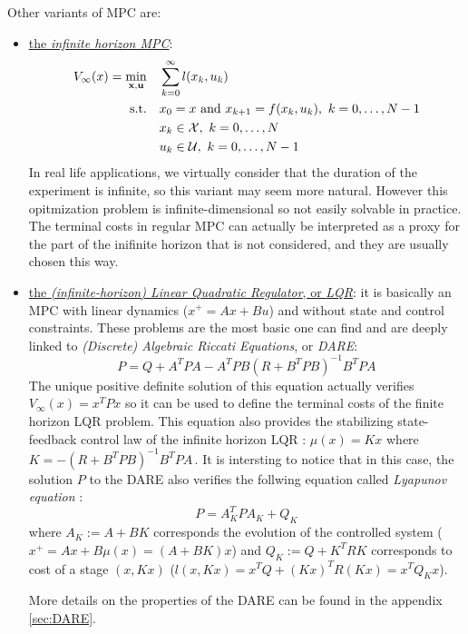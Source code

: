 \documentclass[12pt]{article}
\begin{document}
\vspace{12pt}

Other variants of MPC are:
\begin{itemize}[label=\textbullet]
	\item \underline{the \textit{infinite horizon MPC}}: 
	\begin{align*}
		V_\infty(x)=\underset{\mathbf{x},\mathbf{u}}{\min} &\quad \sum_{k=0}^{\infty}l(x_k,u_k)\\
		\text{s.t.} &\quad x_0=x\text{ and }x_{k+1}=f(x_k,u_k),~k=0,\dots,N-1\\
		&\quad x_k\in\cal{X},~k=0,\dots,N\\
		&\quad u_k\in\cal{U},~k=0,\dots,N-1
	\end{align*}
	In real life applications, we virtually consider that the duration of the experiment is infinite, so this variant may seem more natural.
	However this opitmization problem is infinite-dimensional so not easily solvable in practice.
	The terminal costs in regular MPC can actually be interpreted as a proxy for the part of the inifinite horizon that is not considered, and they are usually chosen this way.

	\item\underline{the \textit{(infinite-horizon) Linear Quadratic Regulator}, or \textit{LQR}}:\newline
	it is basically an MPC with linear dynamics ($x^+=Ax+Bu$) and without state and control constraints.
	These problems are the most basic one can find and are deeply linked to \textit{(Discrete) Algebraic Riccati Equations}, or \textit{DARE}:
	\begin{equation}
		\label{eq:DARE-LQR}
		P=Q+A^TPA-A^TPB(R+B^TPB)^{-1}B^TPA
	\end{equation}
	The unique positive definite solution of this equation actually verifies $V_\infty(x)=x^TPx$ so it can be used to define the terminal costs of the finite horizon LQR problem.
	This equation also provides the stabilizing state-feedback control law of the infinite horizon LQR : $\mu(x)=Kx$ where $K=-(R+B^TPB)^{-1}B^TPA$\,.
	It is intersting to notice that in this case, the solution $P$ to the DARE also verifies the follwing equation called \textit{Lyapunov equation} :
	$$P=A_K^TPA_K+Q_K$$
	where $A_K:=A+BK$ corresponds the evolution of the controlled system ($x^+=Ax+B\mu(x)=(A+BK)x$) and $Q_K:=Q+K^TRK$ corresponds to cost of a stage $(x,Kx)$ ($l(x,Kx)=x^TQ+(Kx)^TR(Kx)=x^TQ_Kx$).

	More details on the properties of the DARE can be found in the appendix \ref{sec:DARE}.
\end{itemize}
\end{document}
